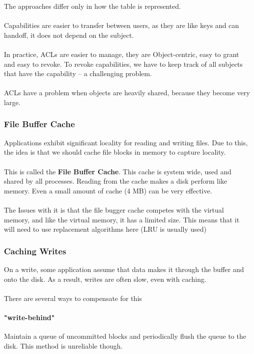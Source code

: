 \documentclass{article}
\begin{document}
The approaches differ only in how the table is represented.
\\
\\
Capabilities are easier to transfer between users, as they are like keys and can handoff, it does not depend on the subject.
\\
\\
In practice, ACLs are easier to manage, they are Object-centric, easy to grant and easy to revoke. To revoke capabilities, we have to keep track of all subjects that have the capability -- a challenging problem.
\\
\\

ACLs have a problem when objects are heavily shared, because they become very large.

\subsubsection{File Buffer Cache}

Applications exhibit significant locality for reading and writing files. Due to this, the idea is that we should cache file blocks in memory to capture locality.
\\
\\
This is called the \textbf{File Buffer Cache}. This cache is system wide, used and shared by all processes. Reading from the cache makes a disk perform like memory. Even a small amount of cache (4 MB) can be very effective.
\\
\\
The Issues with it is that the file bugger cache competes with the virtual memory, and like the virtual memory, it has a limited size. This means that it will need to use replacement algorithms here (LRU is usually used)

\subsubsection{Caching Writes}

On a write, some application assume that data makes it through the buffer and onto the disk. As a result, writes are often slow, even with caching.
\\
\\
There are several ways to compensate for this

\paragraph{"write-behind"} Maintain a queue of uncommitted blocks and periodically flush the queue to the disk. This method is unreliable though.
\end{document}
